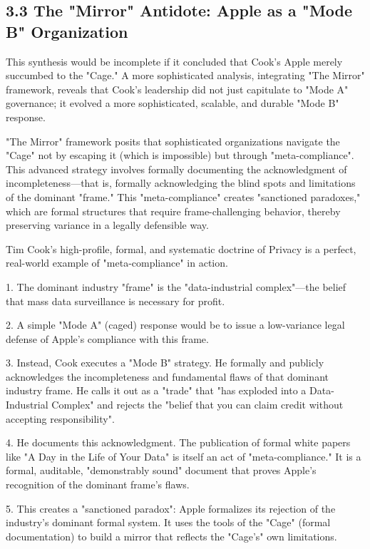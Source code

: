 \documentclass[12pt]{article}
\begin{document}
\subsection{3.3 The "Mirror" Antidote: Apple as a "Mode B" Organization}

This synthesis would be incomplete if it concluded that Cook's Apple merely succumbed to the "Cage." A more sophisticated analysis, integrating "The Mirror" framework, reveals that Cook's leadership did not just capitulate to "Mode A" governance; it evolved a more sophisticated, scalable, and durable "Mode B" response.

"The Mirror" framework posits that sophisticated organizations navigate the "Cage" not by escaping it (which is impossible) but through "meta-compliance". This advanced strategy involves formally documenting the acknowledgment of incompleteness—that is, formally acknowledging the blind spots and limitations of the dominant "frame." This "meta-compliance" creates "sanctioned paradoxes," which are formal structures that require frame-challenging behavior, thereby preserving variance in a legally defensible way.

Tim Cook's high-profile, formal, and systematic doctrine of Privacy is a perfect, real-world example of "meta-compliance" in action.

1. The dominant industry "frame" is the "data-industrial complex"—the belief that mass data surveillance is necessary for profit.

2. A simple "Mode A" (caged) response would be to issue a low-variance legal defense of Apple's compliance with this frame.

3. Instead, Cook executes a "Mode B" strategy. He formally and publicly acknowledges the incompleteness and fundamental flaws of that dominant industry frame. He calls it out as a "trade" that "has exploded into a Data-Industrial Complex" and rejects the "belief that you can claim credit without accepting responsibility".

4. He documents this acknowledgment. The publication of formal white papers like "A Day in the Life of Your Data" is itself an act of "meta-compliance." It is a formal, auditable, "demonstrably sound" document that proves Apple's recognition of the dominant frame's flaws.

5. This creates a "sanctioned paradox": Apple formalizes its rejection of the industry's dominant formal system. It uses the tools of the "Cage" (formal documentation) to build a mirror that reflects the "Cage's" own limitations.
\end{document}
